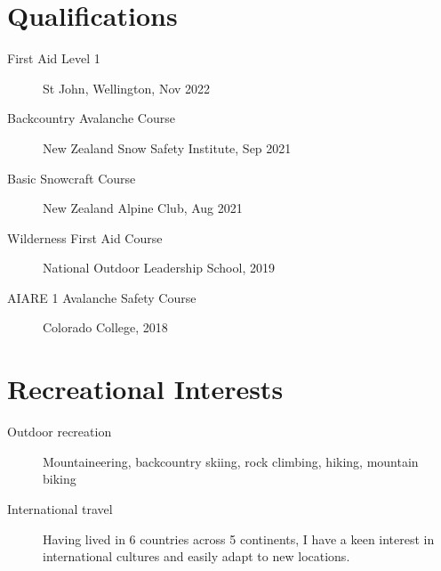\documentclass{ExpressiveResume}
\begin{document}
\section{Qualifications}
\begin{description}
    \item[First Aid Level 1] St John, Wellington, Nov 2022
    \item[Backcountry Avalanche Course] New Zealand Snow Safety Institute,
        Sep 2021
    \item[Basic Snowcraft Course] New Zealand Alpine Club, Aug 2021
    \item[Wilderness First Aid Course] National Outdoor Leadership
        School, 2019
    \item[AIARE 1 Avalanche Safety Course] Colorado College, 2018
\end{description}


\section{Recreational Interests}
\begin{description}
    \item[Outdoor recreation] Mountaineering, backcountry skiing, rock climbing, hiking, mountain biking
    \item[International travel] Having lived in 6 countries across 5
        continents, I have a keen interest in international
        cultures and easily adapt to new locations.
\end{description}
\end{document}
